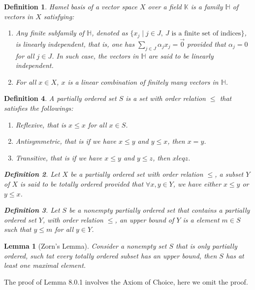 \documentclass[11pt]{book}
\theoremstyle{break}
\theoremstyle{break}
\newtheorem{lem}{Lemma}[thm]
\newtheorem{defn}{Definition}[corL]
\begin{document}
\begin{defn}
Hamel basis of a vector space $X$ over a field $\mathbb{K}$ is a family $\mathbb{H}$ of vectors in $X$ satisfying:
\begin{enumerate}[topsep=3pt,itemsep=-1ex,partopsep=1ex,parsep=1ex]
\item Any finite subfamily of $\mathbb{H}$, denoted as $\{x_j \mid j \in J,\ J\text{ is a finite set of indices}\}$, is linearly independent, that is, one has $\sum_{j\in J}\alpha_j x_j = \vec{0}$ provided that $\alpha_j = 0$ for all $j \in J$. In such case, the vectors in $\mathbb{H}$ are said to be linearly independent.
\item For all $ x \in X$, $x$ is a linear combination of finitely many vectors in $\mathbb{H}$.
\end{enumerate}
\end{defn}

\newpage
\begin{defn}
A partially ordered set $S$ is a set with order relation $\leq$ that satisfies the followings:
\begin{enumerate}[topsep=3pt,itemsep=-1ex,partopsep=1ex,parsep=1ex]
\item Reflexive, that is $x\leq x$ for all $x \in S$.
\item Antisymmetric, that is if we have $x\leq y$ and $y\leq x$, then $x = y$.
\item Transitive, that is if we have $x\leq y$ and $y \leq z$, then $x leq z$.
\end{enumerate}  


\begin{defn}
Let $X$ be a partially ordered set with order relation $\leq$, a subset $Y$ of $X$ is said to be totally ordered provided that $\forall	 x, y\in Y$, we have either $x \leq y$ or $y \leq x$.
\end{defn}

\begin{defn}
Let $S$ be a nonempty partially ordered set that contains a partially ordered set $Y$, with order relation $\leq$, an upper bound of $Y$ is a element $m\in S$ such that $y \leq m$ for all $y \in Y$.
\end{defn}

\end{defn}

\begin{lem}[Zorn's Lemma]
Consider a nonempty set $S$ that is only partially ordered, such tat every totally ordered subset has an upper bound, then $S$ has at least one maximal element.
\end{lem}
The proof of Lemma 8.0.1 involves the Axiom of Choice, here we omit the proof. 
\end{document}
